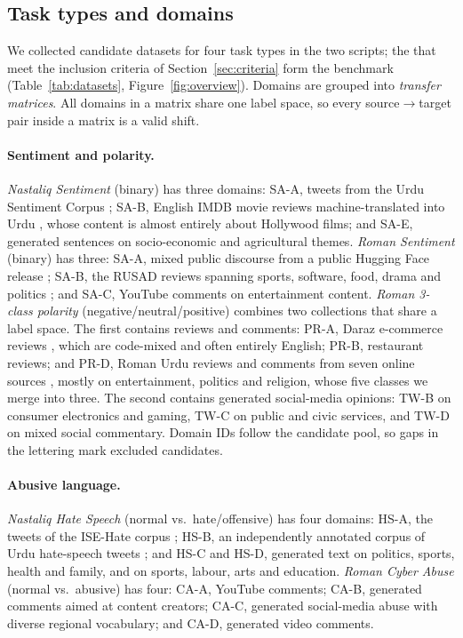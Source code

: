 \documentclass[acmsmall,screen]{acmart}
\begin{document}
\subsection{Task types and domains}\label{sec:domains}
We collected \NumDomainsVten{} candidate datasets for four task types in the two scripts; the \NumDomains{} that meet the inclusion criteria of Section~\ref{sec:criteria} form the benchmark (Table~\ref{tab:datasets}, Figure~\ref{fig:overview}). Domains are grouped into \NumMatrices{} \emph{transfer matrices}. All domains in a matrix share one label space, so every source$\rightarrow$target pair inside a matrix is a valid shift.

\paragraph{Sentiment and polarity.} \emph{Nastaliq Sentiment} (binary) has three domains: SA-A, tweets from the Urdu Sentiment Corpus \citep{khan2020usc}; SA-B, English IMDB movie reviews machine-translated into Urdu \citep{mirfan899imdb}, whose content is almost entirely about Hollywood films; and SA-E, generated sentences on socio-economic and agricultural themes. \emph{Roman Sentiment} (binary) has three: SA-A, mixed public discourse from a public Hugging Face release \citep{ayeshasameer2024romanurdu}; SA-B, the RUSAD reviews spanning sports, software, food, drama and politics \citep{mehmood2019rusad}; and SA-C, YouTube comments on entertainment content. \emph{Roman 3-class polarity} (negative/neutral/positive) combines two collections that share a label space. The first contains reviews and comments: PR-A, Daraz e-commerce reviews \citep{daraz2023kaggle}, which are code-mixed and often entirely English; PR-B, restaurant reviews; and PR-D, Roman Urdu reviews and comments from seven online sources \citep{soomro2024ruwv}, mostly on entertainment, politics and religion, whose five classes we merge into three. The second contains generated social-media opinions: TW-B on consumer electronics and gaming, TW-C on public and civic services, and TW-D on mixed social commentary. Domain IDs follow the candidate pool, so gaps in the lettering mark excluded candidates.

\paragraph{Abusive language.} \emph{Nastaliq Hate Speech} (normal vs.\ hate/offensive) has four domains: HS-A, the tweets of the ISE-Hate corpus \citep{akram2023isehate}; HS-B, an independently annotated corpus of Urdu hate-speech tweets \citep{adnan2025urduhate}; and HS-C and HS-D, generated text on politics, sports, health and family, and on sports, labour, arts and education. \emph{Roman Cyber Abuse} (normal vs.\ abusive) has four: CA-A, YouTube comments; CA-B, generated comments aimed at content creators; CA-C, generated social-media abuse with diverse regional vocabulary; and CA-D, generated video comments.
\end{document}
